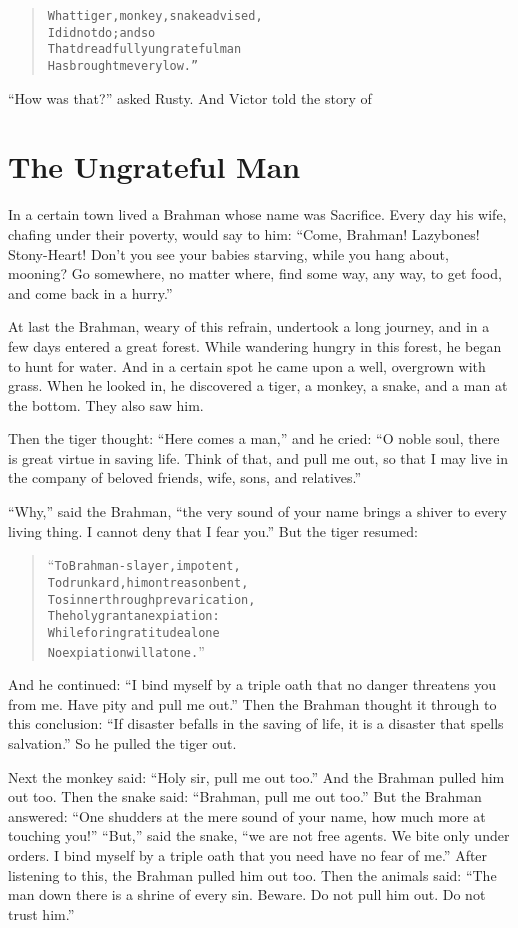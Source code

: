 \documentclass[article, twoside, 14pt]{memoir}
\renewenvironment{verbatim}{%
\begin{quote}%
\vskip -10pt%
\begin{alltt}\normalfont\large}{\end{alltt}%
\end{quote}%
\vskip -10pt
} %
\begin{document}
\begin{verbatim}
What tiger, monkey, snake advised,
    I did not do; and so
That dreadfully ungrateful man
    Has brought me very low.”
\end{verbatim}
``How was that?'' asked Rusty. And Victor told the story of

\chapter{The Ungrateful Man}

\label{s12}

In a certain town lived a Brahman whose name was Sacrifice.
Every day his wife, chafing under their poverty, would say to him:
``Come, Brahman! Lazybones! Stony-Heart! Don't you see your babies starving, while you hang about, mooning? Go somewhere, no matter where, find some way, any way, to get food, and come back in a hurry.''

At last the Brahman, weary of this refrain, undertook a long
journey, and in a few days entered a great forest. While wandering
hungry in this forest, he began to hunt for water. And in a certain
spot he came upon a well, overgrown with grass. When he looked in,
he discovered a tiger, a monkey, a snake, and a man at the bottom.
They also saw him.

Then the tiger thought: ``Here comes a man,'' and he cried:
``O noble soul, there is great virtue in saving life. Think of that, and pull me out, so that I may live in the company of beloved friends, wife, sons, and relatives.''

``Why,'' said the Brahman,
``the very sound of your name brings a shiver to every living thing. I cannot deny that I fear you.''
But the tiger resumed:

\begin{verbatim}
“To Brahman-slayer, impotent,
To drunkard, him on treason bent,
To sinner through prevarication,
The holy grant an expiation:
While for ingratitude alone
No expiation will atone.”
\end{verbatim}
And he continued:
``I bind myself by a triple oath that no danger threatens you from me. Have pity and pull me out.''
Then the Brahman thought it through to this conclusion:
``If disaster befalls in the saving of life, it is a disaster that spells salvation.''
So he pulled the tiger out.

Next the monkey said: ``Holy sir, pull me out too.'' And the
Brahman pulled him out too. Then the snake said:
``Brahman, pull me out too.'' But the Brahman answered:
``One shudders at the mere sound of your name, how much more at touching you!''
``But,'' said the snake,
``we are not free agents. We bite only under orders. I bind myself by a triple oath that you need have no fear of me.''
After listening to this, the Brahman pulled him out too. Then the
animals said:
``The man down there is a shrine of every sin. Beware. Do not pull him out. Do not trust him.''
\end{document}

